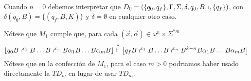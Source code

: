 \begin{frame}
  \begin{block}{}
    \PN Cuando $n=0$ debemos interpretar que $D_{0} = \left(\{q_{0},q_{f}\}, \Gamma, \Sigma, \delta, q_{0}, B,
    \shortmid, \{q_{f}\}\right)$, con $\delta(q_{0},B) = \{(q_{f},B,K)\}$ y $\delta = \emptyset$ en cualquier otro caso.

    \PN Nótese que $M_{1}$ cumple que, para cada $(\vec{x},\vec{\alpha}) \in \omega^{n} \times \Sigma^{\ast m}$
    \normLetter
    \begin{equation*}
      \left\lfloor q_{0} B \shortmid^{x_{1}} B \dotsc B \shortmid^{x_{n}} B \alpha_{1} B \dotsc B \alpha_{m} B
      \right\rfloor \overset{\ast}{\vdash} \left\lfloor q_{f} B \shortmid^{x_{1}} B \dotsc B \shortmid^{x_{n}} B^{k-n}B
      \alpha_{1} B \dotsc B \alpha_{m} B \right\rfloor
    \end{equation*}
    \sizeOfLetterThird
    \PN Nótese que en la confección de $M_{1}$, para el caso $m>0$ podriamos haber usado directamente la $TD_{m}$ en
    lugar de usar $TD_{m}$.
  \end{block}
\end{frame}
